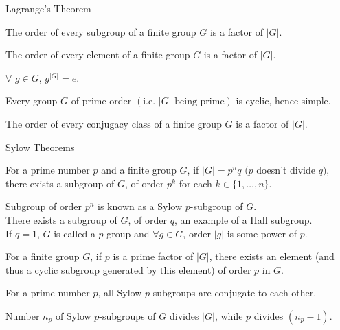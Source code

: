 \documentclass{beamer}
\begin{document}
\begin{frame}{Lagrange's Theorem}
    \begin{theorem}
        The order of every subgroup of a finite group $G$ is a factor of $\lvert G\rvert$.
    \end{theorem}
    \begin{corollary}
        The order of every element of a finite group $G$ is a factor of $\lvert G\rvert$.
    \end{corollary}
    \begin{corollary}
        $\forall$ $g\in G$, $g^{\lvert G\rvert}=e$.
    \end{corollary}
    \begin{corollary}
        Every group $G$ of prime order $(\text{i.e. }\lvert G\rvert\text{ being prime})$ is cyclic, hence simple.
    \end{corollary}
    \begin{corollary}
        The order of every conjugacy class of a finite group $G$ is a factor of $\lvert G\rvert$.
    \end{corollary}
\end{frame}

\begin{frame}{Sylow Theorems}
    \begin{theorem}
        For a prime number $p$ and a finite group $G$, if $\lvert G\rvert=p^nq$ $(p$ doesn't divide $q)$, there exists a subgroup of $G$, of order $p^k$ for each $k\in\{1,\dots,n\}$.
    \end{theorem}
    Subgroup of order $p^n$ is known as a Sylow $p$-subgroup of $G$.\\
    There exists a subgroup of $G$, of order $q$, an example of a Hall subgroup.\\
    If $q=1$, $G$ is called a $p$-group and $\forall g\in G$, order $\lvert g\rvert$ is some power of $p$.
    \begin{corollary}
        For a finite group $G$, if $p$ is a prime factor of $\lvert G\rvert$, there exists an element (and thus a cyclic subgroup generated by this element) of order $p$ in $G$.
    \end{corollary}
    \begin{theorem}
        For a prime number $p$, all Sylow $p$-subgroups are conjugate to each other.
    \end{theorem}
    \begin{theorem}
        Number $n_p$ of Sylow $p$-subgroups of $G$ divides $\lvert G\rvert$, while $p$ divides $(n_p-1)$.
    \end{theorem}
\end{frame}
\end{document}
